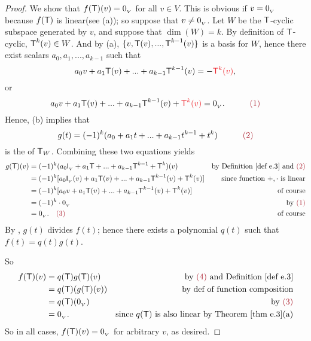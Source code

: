 \begin{proof}
We show that \(f(\textsf{T})(v) = 0_{_V}\) for all \(v \in V\).
This is obvious if \(v = 0_{_V}\) because \(f(\textsf{T})\) is linear(see (a)); so suppose that \(v \ne 0_{_V}\).
Let \(W\) be the \(\textsf{T}\)-cyclic subspace generated by \(v\), and suppose that \(\dim(W) = k\).
By definition of \(\textsf{T}\)-cyclic, \(\textsf{T}^k(v) \in W\).
And by (a), \(\{ v, \textsf{T}(v), ..., \textsf{T}^{k - 1}(v) \}\) is a basis for \(W\), hence there exist scalars \(a_0, a_1, ..., a_{k-1}\) such that
\[
    a_0 v + a_1 \T(v) + ... + a_{k - 1} \T^{k - 1}(v) = -\RED{\T^k(v)},
\]
or
\[
    a_0 v + a_1 \T(v) + ... + a_{k - 1} \T^{k - 1}(v) + \RED{\T^k(v)} = \OV. \quad \quad \quad \MAROON{(1)}
\]
Hence, (b) implies that
\[
    g(t) = (-1)^k (a_0 + a_1 t + ... + a_{k - 1} t^{k - 1} + t^k) \quad \quad \quad \MAROON{(2)}
\]
is the \CPOLY{} of \(\textsf{T}_W\).
Combining these two equations yields
\begin{align*}
    g(\T)(v) & = (-1)^k (a_0 \ITRANV{} + a_1 \T + ... + a_{k - 1} \T^{k - 1} + \T^k)(v) & \text{by \DEF{e.3} and \MAROON{(2)}} \\
        & = (-1)^k [ a_0 \ITRANV{}(v) + a_1\T(v) + ... + a_{k - 1} \T^{k - 1}(v) + \T^k(v) ] & \text{since function \(+, \cdot\) is linear} \\
        & = (-1)^k [ a_0 v + a_1\T(v) + ... + a_{k - 1} \T^{k - 1}(v) + \T^k(v) ] & \text{of course} \\
        & = (-1)^k \cdot \OV & \text{by \MAROON{(1)}} \\
        & = \OV. \quad \MAROON{(3)} & \text{of course}
\end{align*}
By , \(g(t)\) divides \(f(t)\); hence there exists a polynomial \(q(t)\) such that \(f(t) = q(t)g(t)\). 

So
\begin{align*}
    f(\T)(v) & = q(\T)g(\T)(v) & \text{by \MAROON{(4)} and \DEF{e.3}} \\
             & = q(\T)(g(\T)(v)) & \text{by def of function composition} \\
             & = q(\T)(\OV) & \text{by \MAROON{(3)}} \\
             & = \OV. & \text{since \(q(\T)\) is also linear by \THM{e.3}(a)}
\end{align*}
So in all cases, \(f(\textsf{T})(v) = 0_{_V}\) for arbitrary \(v\), as desired.
\end{proof}

